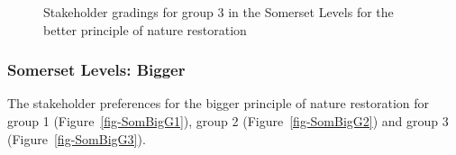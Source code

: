 \documentclass[
  12pt,
  letterpaper,
  DIV=11,
  numbers=noendperiod]{scrartcl}
\begin{document}
\begin{figure}[H]


\caption{\label{fig-SomBetterG3}Stakeholder gradings for group 3 in the
Somerset Levels for the better principle of nature restoration}

\end{figure}%

\newpage{}

\subsubsection{Somerset Levels: Bigger}\label{somerset-levels-bigger}

The stakeholder preferences for the bigger principle of nature
restoration for group 1 (Figure~\ref{fig-SomBigG1}), group 2
(Figure~\ref{fig-SomBigG2}) and group 3 (Figure~\ref{fig-SomBigG3}).
\end{document}
